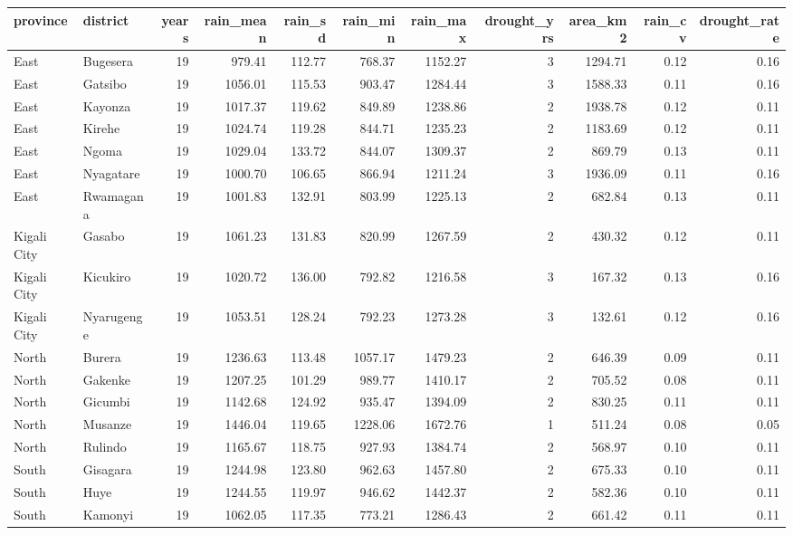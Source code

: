 \begin{tabular}{llrrrrrrrrr}
\toprule
province & district & years & rain\_mean & rain\_sd & rain\_min & rain\_max & drought\_yrs & area\_km2 & rain\_cv & drought\_rate \\
\midrule
East & Bugesera & 19 & 979.41 & 112.77 & 768.37 & 1152.27 & 3 & 1294.71 & 0.12 & 0.16 \\
East & Gatsibo & 19 & 1056.01 & 115.53 & 903.47 & 1284.44 & 3 & 1588.33 & 0.11 & 0.16 \\
East & Kayonza & 19 & 1017.37 & 119.62 & 849.89 & 1238.86 & 2 & 1938.78 & 0.12 & 0.11 \\
East & Kirehe & 19 & 1024.74 & 119.28 & 844.71 & 1235.23 & 2 & 1183.69 & 0.12 & 0.11 \\
East & Ngoma & 19 & 1029.04 & 133.72 & 844.07 & 1309.37 & 2 & 869.79 & 0.13 & 0.11 \\
East & Nyagatare & 19 & 1000.70 & 106.65 & 866.94 & 1211.24 & 3 & 1936.09 & 0.11 & 0.16 \\
East & Rwamagana & 19 & 1001.83 & 132.91 & 803.99 & 1225.13 & 2 & 682.84 & 0.13 & 0.11 \\
Kigali City & Gasabo & 19 & 1061.23 & 131.83 & 820.99 & 1267.59 & 2 & 430.32 & 0.12 & 0.11 \\
Kigali City & Kicukiro & 19 & 1020.72 & 136.00 & 792.82 & 1216.58 & 3 & 167.32 & 0.13 & 0.16 \\
Kigali City & Nyarugenge & 19 & 1053.51 & 128.24 & 792.23 & 1273.28 & 3 & 132.61 & 0.12 & 0.16 \\
North & Burera & 19 & 1236.63 & 113.48 & 1057.17 & 1479.23 & 2 & 646.39 & 0.09 & 0.11 \\
North & Gakenke & 19 & 1207.25 & 101.29 & 989.77 & 1410.17 & 2 & 705.52 & 0.08 & 0.11 \\
North & Gicumbi & 19 & 1142.68 & 124.92 & 935.47 & 1394.09 & 2 & 830.25 & 0.11 & 0.11 \\
North & Musanze & 19 & 1446.04 & 119.65 & 1228.06 & 1672.76 & 1 & 511.24 & 0.08 & 0.05 \\
North & Rulindo & 19 & 1165.67 & 118.75 & 927.93 & 1384.74 & 2 & 568.97 & 0.10 & 0.11 \\
South & Gisagara & 19 & 1244.98 & 123.80 & 962.63 & 1457.80 & 2 & 675.33 & 0.10 & 0.11 \\
South & Huye & 19 & 1244.55 & 119.97 & 946.62 & 1442.37 & 2 & 582.36 & 0.10 & 0.11 \\
South & Kamonyi & 19 & 1062.05 & 117.35 & 773.21 & 1286.43 & 2 & 661.42 & 0.11 & 0.11 \\

\end{tabular}
